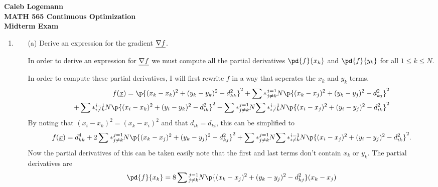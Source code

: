 \documentclass[11pt, oneside]{article}
\begin{document}
\noindent \textbf{\Large{Caleb Logemann \\
MATH 565 Continuous Optimization \\
Midterm Exam
}}

%
\begin{enumerate}
  \item %
    \begin{enumerate}
      \item[(a)] %
        Derive an expression for the gradient $\underline{\nabla f}$.

        In order to derive an expression for $\underline{\nabla f}$ we must compute all
        the partial derivatives $\pd{f}{x_k}$ and $\pd{f}{y_k}$ for all
        $1 \le k \le N$.

        In order to compute these partial derivatives, I will first rewrite $f$
        in a way that seperates the $x_k$ and $y_k$ terms.
        \begin{align*}
          f(\v{x}) = \p{(x_k - x_k)^2 + (y_k - y_k)^2 - d_{kk}^2}^2
          + \sum*{\substack{j = 1 \\ j \neq k}}{N}{\p{(x_k - x_j)^2 + (y_k - y_j)^2 - d_{kj}^2}^2} \\
          + \sum*{\substack{i = 1 \\ i \neq k}}{N}{\p{(x_i - x_k)^2 + (y_i - y_k)^2 - d_{ik}^2}^2}
          + \sum*{\substack{j = 1 \\ j \neq k}}{N}{\sum*{\substack{i = 1 \\ i \neq k}}{N}{\p{(x_i - x_j)^2 + (y_i - y_j)^2 - d_{ik}^2}^2}}
        \end{align*}
        By noting that $(x_i - x_k)^2 = (x_k - x_i)^2$ and that $d_{ik} = d_{ki}$,
        this can be simplified to
        \begin{align*}
          f(\v{x}) = d_{kk}^4
          + 2\sum*{\substack{j = 1 \\ j \neq k}}{N}{\p{(x_k - x_j)^2 + (y_k - y_j)^2 - d_{kj}^2}^2}
          + \sum*{\substack{j = 1 \\ j \neq k}}{N}{\sum*{\substack{i = 1 \\ i \neq k}}{N}{\p{(x_i - x_j)^2 + (y_i - y_j)^2 - d_{ik}^2}^2}}.
        \end{align*}
        Now the partial derivatives of this can be taken easily note that the
        first and last terms don't contain $x_k$ or $y_k$.
        The partial derivatives are
        \begin{align*}
          \pd{f}{x_k} &= 8 \sum{\substack{j = 1 \\ j \neq k}}{N}{\p{(x_k - x_j)^2 + (y_k - y_j)^2 - d_{kj}^2}(x_k - x_j)} \\

\end{align*}
\end{enumerate}
\end{enumerate}
\end{document}
